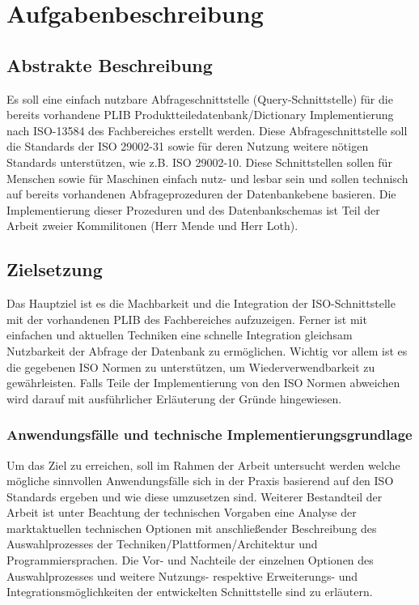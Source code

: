 \chapter{Aufgabenbeschreibung} \label{Aufgabenbeschreibung}

\section{Abstrakte Beschreibung}

Es soll eine einfach nutzbare Abfrageschnittstelle (Query-Schnittstelle) für die bereits vorhandene PLIB Produktteiledatenbank/Dictionary Implementierung nach ISO-13584 des Fachbereiches erstellt werden. Diese Abfrageschnittstelle soll die Standards der ISO 29002-31 sowie für deren Nutzung weitere nötigen Standards unterstützen, wie z.B. ISO 29002-10. Diese Schnittstellen sollen für Menschen sowie für Maschinen einfach nutz- und lesbar sein und sollen technisch auf bereits vorhandenen Abfrageprozeduren der Datenbankebene basieren. Die Implementierung dieser Prozeduren und des Datenbankschemas ist Teil der Arbeit zweier Kommilitonen (Herr Mende und Herr Loth).

\section{Zielsetzung}

Das Hauptziel ist es die Machbarkeit und die Integration der ISO-Schnittstelle mit der vorhandenen PLIB des Fachbereiches aufzuzeigen. 
Ferner ist mit einfachen und aktuellen Techniken eine schnelle Integration gleichsam Nutzbarkeit der Abfrage der Datenbank zu ermöglichen. Wichtig vor allem ist es die gegebenen ISO Normen zu unterstützen, um Wiederverwendbarkeit zu gewährleisten. Falls Teile der Implementierung von den ISO Normen abweichen wird darauf mit ausführlicher Erläuterung der Gründe hingewiesen. 

\subsection{Anwendungsfälle und technische Implementierungsgrundlage}

Um das Ziel zu erreichen, soll im Rahmen der Arbeit untersucht werden welche mögliche sinnvollen Anwendungsfälle sich in der Praxis basierend auf den ISO Standards ergeben und wie diese umzusetzen sind. Weiterer Bestandteil der Arbeit ist unter Beachtung der technischen Vorgaben eine Analyse der marktaktuellen technischen Optionen mit anschließender Beschreibung des Auswahlprozesses der Techniken/Plattformen/Architektur und Programmiersprachen. Die Vor- und Nachteile der einzelnen Optionen des Auswahlprozesses und weitere Nutzungs- respektive Erweiterungs- und Integrationsmöglichkeiten der entwickelten Schnittstelle sind zu erläutern. 

